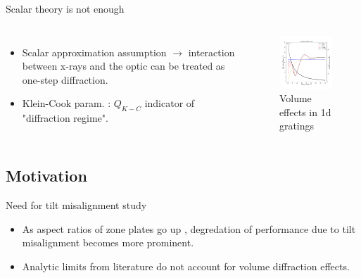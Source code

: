 \documentclass{beamer}
\begin{document}
\begin{frame}{Scalar theory is not enough}
	\begin{block}{}
		\begin{columns}[onlytextwidth,T]
			\column{\dimexpr\linewidth-30mm-10mm}
			\begin{itemize}
				\item Scalar approximation assumption $\rightarrow$ interaction between x-rays and the optic can be treated as one-step diffraction. 
				\item Klein-Cook param. : $Q_{K-C}$ indicator of 
				"diffraction regime"\footnotemark.
			\end{itemize}
			\column{30mm}
			\begin{figure}
				\vspace*{-0.75cm}\hspace*{-0.75cm}\includegraphics[width=45mm]{grating}
				\caption{Volume effects in 1d gratings}
			\end{figure}
		\end{columns}
	\end{block}
\end{frame}

\subsection{Motivation}
\begin{frame}{Need for tilt misalignment study \footnotemark 	{}}
	\begin{itemize}
		\item As aspect ratios of zone plates go up\footnotemark {} , degredation of performance due to tilt misalignment becomes more prominent.
		\item Analytic limits\footnotemark 	{} from literature do not account for volume diffraction effects.
	\end{itemize}

\end{frame}
\end{document}
